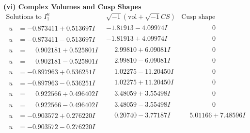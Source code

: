 \documentclass[1p]{elsarticle_modified}
\theoremstyle{definition}
\newcommand{\I}{\sqrt{-1}}
\begin{document}
\newpage\flushleft \textbf{(vi) Complex Volumes and Cusp Shapes}
$$\begin{array}{c|c|c}  
\text{Solutions to }I^u_{1}& \I (\text{vol} + \sqrt{-1}CS) & \text{Cusp shape}\\
 \hline 
\begin{aligned}
u &= -0.873411 + 0.513697 I\end{aligned}
 & -1.81913 - 4.09974 I & \phantom{-0.000000 } 0 \\ \hline\begin{aligned}
u &= -0.873411 - 0.513697 I\end{aligned}
 & -1.81913 + 4.09974 I & \phantom{-0.000000 } 0 \\ \hline\begin{aligned}
u &= \phantom{-}0.902181 + 0.525801 I\end{aligned}
 & \phantom{-}2.99810 + 6.09081 I & \phantom{-0.000000 } 0 \\ \hline\begin{aligned}
u &= \phantom{-}0.902181 - 0.525801 I\end{aligned}
 & \phantom{-}2.99810 - 6.09081 I & \phantom{-0.000000 } 0 \\ \hline\begin{aligned}
u &= -0.897963 + 0.536251 I\end{aligned}
 & \phantom{-}1.02275 - 11.20450 I & \phantom{-0.000000 } 0 \\ \hline\begin{aligned}
u &= -0.897963 - 0.536251 I\end{aligned}
 & \phantom{-}1.02275 + 11.20450 I & \phantom{-0.000000 } 0 \\ \hline\begin{aligned}
u &= \phantom{-}0.922566 + 0.496402 I\end{aligned}
 & \phantom{-}3.48059 + 3.55498 I & \phantom{-0.000000 } 0 \\ \hline\begin{aligned}
u &= \phantom{-}0.922566 - 0.496402 I\end{aligned}
 & \phantom{-}3.48059 - 3.55498 I & \phantom{-0.000000 } 0 \\ \hline\begin{aligned}
u &= -0.903572 + 0.276220 I\end{aligned}
 & \phantom{-}0.20740 - 3.77187 I & \phantom{-}5.01166 + 7.48596 I \\ \hline\begin{aligned}
u &= -0.903572 - 0.276220 I\end{aligned}

\end{array}$$
\end{document}

